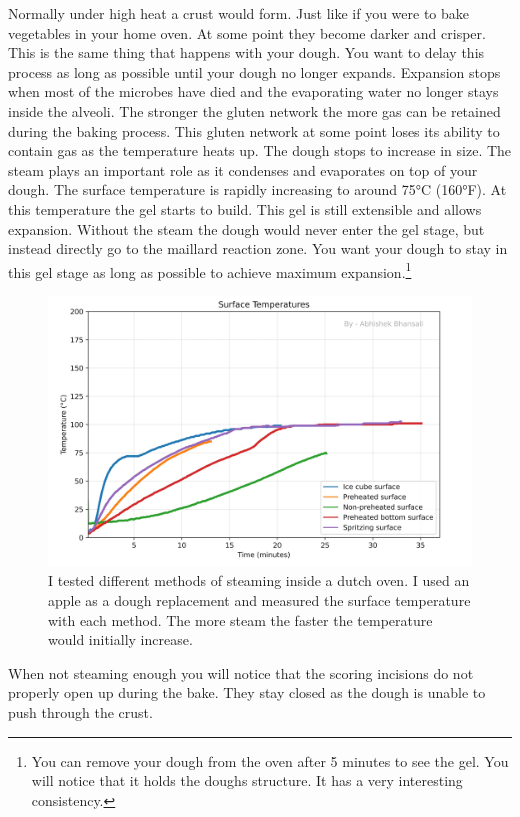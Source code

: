 Normally under high heat a crust would form. Just like
if you were to bake vegetables in your home oven. At some point
they become darker and crisper. This is the same thing that
happens with your dough. You want to delay this process
as long as possible until your dough no longer expands.
Expansion stops when most of the microbes have died and
the evaporating water no longer stays inside the alveoli.
The stronger the gluten network the more gas can be retained
during the baking process. This gluten network at some point
loses its ability to contain gas as the temperature heats
up. The dough stops to increase in size. The steam plays
an important role as it condenses and evaporates on top
of your dough. The surface temperature is rapidly increasing
to around 75°C (160°F). At this temperature the gel starts
to build. This gel is still extensible and allows expansion.
Without the steam the dough would never enter the gel stage,
but instead directly go to the maillard reaction zone. You
want your dough to stay in this gel stage as long as possible
to achieve maximum expansion.\footnote{You can remove your
dough from the oven after 5 minutes to see the gel. You will notice
that it holds the doughs structure. It has a very interesting consistency.}

\begin{figure}[!htb]
  \includegraphics[width=\textwidth]{baking-experiment-temperatures.png}
  \caption{I tested different methods of steaming inside a dutch oven.
  I used an apple as a dough replacement and measured the surface temperature with
  each method. The more steam the faster the temperature would initially increase.}
\end{figure}

When not steaming enough you will notice that the scoring
incisions do not properly open up during the bake. They stay
closed as the dough is unable to push through the crust.

